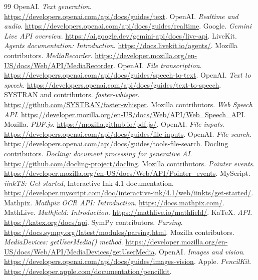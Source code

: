 \documentclass[11pt]{article}
\begin{document}
\begin{thebibliography}{99}
\small
{} OpenAI. \emph{Text generation}. \url{https://developers.openai.com/api/docs/guides/text}.
 OpenAI. \emph{Realtime and audio}. \url{https://developers.openai.com/api/docs/guides/realtime}.
 Google. \emph{Gemini Live API overview}. \url{https://ai.google.dev/gemini-api/docs/live-api}.
 LiveKit. \emph{Agents documentation: Introduction}. \url{https://docs.livekit.io/agents/}.
 Mozilla contributors. \emph{MediaRecorder}. \url{https://developer.mozilla.org/en-US/docs/Web/API/MediaRecorder}.
 OpenAI. \emph{File transcription}. \url{https://developers.openai.com/api/docs/guides/speech-to-text}.
 OpenAI. \emph{Text to speech}. \url{https://developers.openai.com/api/docs/guides/text-to-speech}.
 SYSTRAN and contributors. \emph{faster-whisper}. \url{https://github.com/SYSTRAN/faster-whisper}.
 Mozilla contributors. \emph{Web Speech API}. \url{https://developer.mozilla.org/en-US/docs/Web/API/Web_Speech_API}.
 Mozilla. \emph{PDF.js}. \url{https://mozilla.github.io/pdf.js/}.
 OpenAI. \emph{File inputs}. \url{https://developers.openai.com/api/docs/guides/file-inputs}.
 OpenAI. \emph{File search}. \url{https://developers.openai.com/api/docs/guides/tools-file-search}.
 Docling contributors. \emph{Docling: document processing for generative AI}. \url{https://github.com/docling-project/docling}.
 Mozilla contributors. \emph{Pointer events}. \url{https://developer.mozilla.org/en-US/docs/Web/API/Pointer_events}.
 MyScript. \emph{iinkTS: Get started}, Interactive Ink 4.1 documentation. \url{https://developer.myscript.com/doc/interactive-ink/4.1/web/iinkts/get-started/}.
 Mathpix. \emph{Mathpix OCR API: Introduction}. \url{https://docs.mathpix.com/}.
 MathLive. \emph{Mathfield: Introduction}. \url{https://mathlive.io/mathfield/}.
 KaTeX. \emph{API}. \url{https://katex.org/docs/api}.
 SymPy contributors. \emph{Parsing}. \url{https://docs.sympy.org/latest/modules/parsing.html}.
 Mozilla contributors. \emph{MediaDevices: getUserMedia() method}. \url{https://developer.mozilla.org/en-US/docs/Web/API/MediaDevices/getUserMedia}.
 OpenAI. \emph{Images and vision}. \url{https://developers.openai.com/api/docs/guides/images-vision}.
 Apple. \emph{PencilKit}. \url{https://developer.apple.com/documentation/pencilkit}.

\end{thebibliography}
\end{document}
